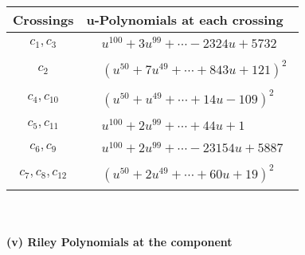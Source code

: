 \documentclass[1p]{elsarticle_modified}
\theoremstyle{definition}
\begin{document}
\begin{tabular}{m{50pt}|m{274pt}}
Crossings & \hspace{64pt}u-Polynomials at each crossing \\
\hline $$\begin{aligned}c_{1},c_{3}\end{aligned}$$&$\begin{aligned}
&u^{100}+3 u^{99}+\cdots-2324 u+5732
\end{aligned}$\\
\hline $$\begin{aligned}c_{2}\end{aligned}$$&$\begin{aligned}
&(u^{50}+7 u^{49}+\cdots+843 u+121)^{2}
\end{aligned}$\\
\hline $$\begin{aligned}c_{4},c_{10}\end{aligned}$$&$\begin{aligned}
&(u^{50}+u^{49}+\cdots+14 u-109)^{2}
\end{aligned}$\\
\hline $$\begin{aligned}c_{5},c_{11}\end{aligned}$$&$\begin{aligned}
&u^{100}+2 u^{99}+\cdots+44 u+1
\end{aligned}$\\
\hline $$\begin{aligned}c_{6},c_{9}\end{aligned}$$&$\begin{aligned}
&u^{100}+2 u^{99}+\cdots-23154 u+5887
\end{aligned}$\\
\hline $$\begin{aligned}c_{7},c_{8},c_{12}\end{aligned}$$&$\begin{aligned}
&(u^{50}+2 u^{49}+\cdots+60 u+19)^{2}
\end{aligned}$\\
\hline
\end{tabular}\\~\\
\newpage\renewcommand{\arraystretch}{1}
\flushleft \textbf{(v) Riley Polynomials at the component}\newline \\
\end{document}
